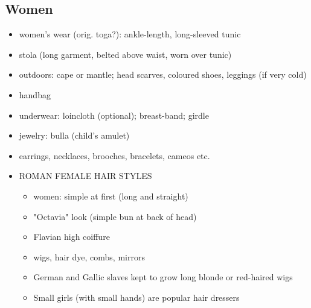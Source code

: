 \documentclass[12pt, twoside]{article}
\begin{document}
\subsection{Women}
\begin{itemize}
\item women's wear (orig. toga?): ankle-length, long-sleeved tunic 
\item stola (long garment, belted above waist, worn over tunic)
\item outdoors: cape or mantle; head scarves, coloured shoes, leggings (if very cold) 
\item handbag
\item underwear: loincloth (optional); breast-band; girdle
\item jewelry: bulla (child's amulet)
\item earrings, necklaces, brooches, bracelets, cameos etc.
\item ROMAN FEMALE HAIR STYLES
	\begin{itemize}
	\item women: simple at first (long and straight)
	\item "Octavia" look (simple bun at back of head)
	\item Flavian high coiffure
	\item wigs, hair dye, combs, mirrors
	\item German and Gallic slaves kept to grow long blonde or red-haired wigs
	\item Small girls (with small hands) are popular hair dressers
	\end{itemize}
\end{itemize}
\end{document}
